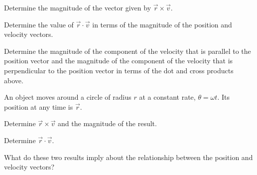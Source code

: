 \begin{problem}
\begin{subproblem}
    \vfill

  \item Determine the magnitude of the vector given by
    $\vec{r}\times\vec{v}$.

    \vfill

  \item Determine the value of $\vec{r}\cdot\vec{v}$ in terms of the
    magnitude of the position and velocity vectors.

    \vfill

  \item Determine the magnitude of the component of the velocity that
    is parallel to the position vector and the magnitude of the
    component of the velocity that is perpendicular to the position
    vector in terms of the dot and cross products above.

    \vfill

  \end{subproblem}
  \clearpage
\item An object moves around a circle of radius $r$  at a constant
  rate, $\theta=\omega t$. Its position at any time is $\vec{r}$.
  \begin{subproblem}
  \item Determine $\vec{r}\times\vec{v}$ and the magnitude of the
    result.

    \vfill

  \item Determine  $\vec{r}\cdot\vec{v}$.

    \vfill

  \item What do these two results imply about the relationship between
    the position and velocity vectors?

    \vfill

  \end{subproblem}
\end{problem}

\postClass


